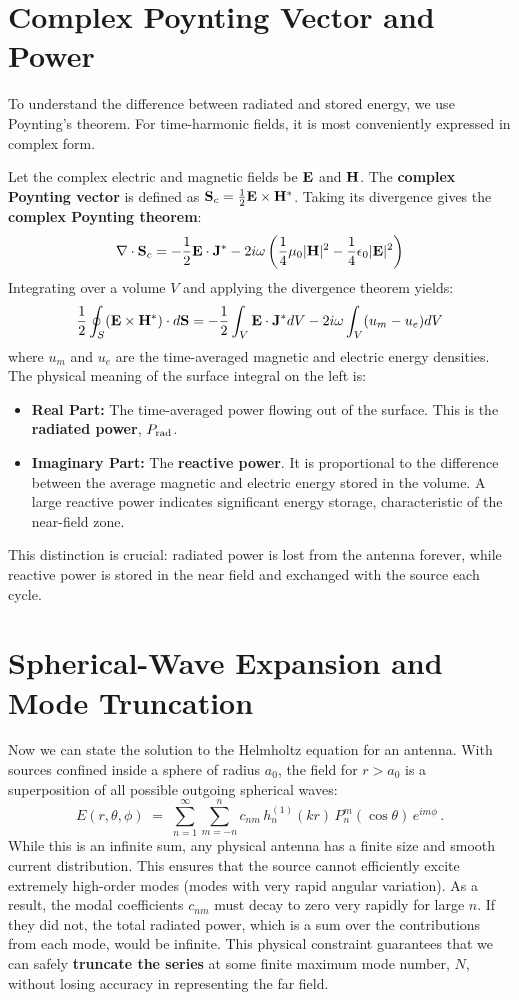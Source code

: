 \documentclass[11pt]{article}
\begin{document}
\section{Complex Poynting Vector and Power}

To understand the difference between radiated and stored energy, we use Poynting's theorem. For time-harmonic fields, it is most conveniently expressed in complex form.

Let the complex electric and magnetic fields be $\vb E$ and $\vb H$. The \textbf{complex Poynting vector} is defined as $\vb S_c = \frac{1}{2}\vb E \times \vb H^*$. Taking its divergence gives the \textbf{complex Poynting theorem}:
\[
\nabla \cdot \vb S_c = - \frac{1}{2} \vb E \cdot \vb J^* - 2i\omega \left( \frac{1}{4}\mu_0 |\vb H|^2 - \frac{1}{4}\epsilon_0 |\vb E|^2 \right)
\]
Integrating over a volume $V$ and applying the divergence theorem yields:
\[
\frac{1}{2}\oint_S (\vb E \times \vb H^*) \cdot d\vb S = -\frac{1}{2}\int_V \vb E \cdot \vb J^* dV - 2i\omega \int_V (u_m - u_e) dV
\]
where $u_m$ and $u_e$ are the time-averaged magnetic and electric energy densities. The physical meaning of the surface integral on the left is:
\begin{itemize}
    \item \textbf{Real Part:} The time-averaged power flowing out of the surface. This is the \textbf{radiated power}, $P_{\rm rad}$.
    \item \textbf{Imaginary Part:} The \textbf{reactive power}. It is proportional to the difference between the average magnetic and electric energy stored in the volume. A large reactive power indicates significant energy storage, characteristic of the near-field zone.
\end{itemize}
This distinction is crucial: radiated power is lost from the antenna forever, while reactive power is stored in the near field and exchanged with the source each cycle.

\section{Spherical-Wave Expansion and Mode Truncation}

Now we can state the solution to the Helmholtz equation for an antenna. With sources confined inside a sphere of radius $a_0$, the field for $r>a_0$ is a superposition of all possible outgoing spherical waves:
\begin{equation}\label{eq:expansion}
E(r,\theta,\phi)\;=\;\sum_{n=1}^\infty\sum_{m=-n}^n c_{n m}\,h_n^{(1)}(kr)\,P_n^m(\cos\theta)\,e^{im\phi}\,.
\end{equation}
While this is an infinite sum, any physical antenna has a finite size and smooth current distribution. This ensures that the source cannot efficiently excite extremely high-order modes (modes with very rapid angular variation). As a result, the modal coefficients $c_{nm}$ must decay to zero very rapidly for large $n$. If they did not, the total radiated power, which is a sum over the contributions from each mode, would be infinite. This physical constraint guarantees that we can safely \textbf{truncate the series} at some finite maximum mode number, $N$, without losing accuracy in representing the far field.
\end{document}
